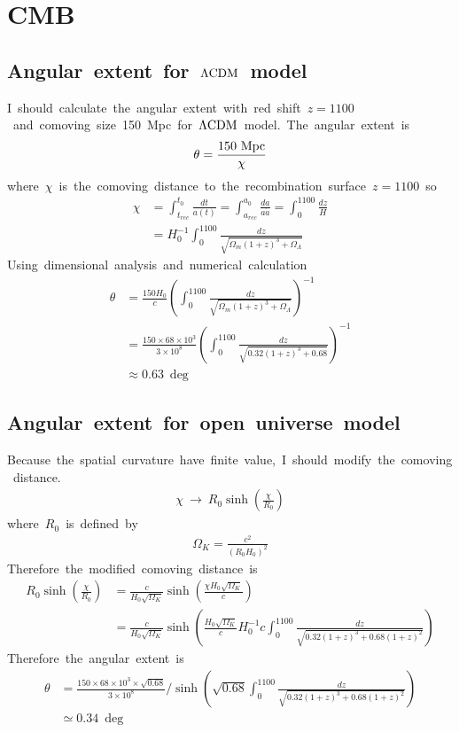 \section{CMB}
\subsection{Angular\ extent\ for\ $\Lambda\rm{CDM}$\ model}
I\ should\ calculate\ the\ angular\ extent\ with\ red\ shift\ $z=1100$\ and\ comoving\ size\ 150\ Mpc\ for\ $\Lambda\rm{CDM}$\ model.\ The\ angular\ extent\ is
\begin{align*}
    \theta=\frac{150\ \rm{Mpc}}{\chi}
\end{align*}
where\ $\chi$\ is\ the\ comoving\ distance\ to\ the\ recombination\ surface\ $z=1100$\ so
\begin{align*}
    \chi&=\int^{t_0}_{t_{rec}}\frac{dt}{a(t)}=\int^{a_0}_{a_{rec}}\frac{da}{a\Dot{a}}=\int^{1100}_0\frac{dz}{H}\\
    &=H_0^{-1}\int^{1100}_0\frac{dz}{\sqrt{\Omega_m(1+z)^3+\Omega_{\Lambda}}}
\end{align*}
Using\ dimensional\ analysis\ and\ numerical\ calculation
\begin{align}
    \theta&=\frac{150H_0}{c}\left(\int^{1100}_0\frac{dz}{\sqrt{\Omega_m(1+z)^3+\Omega_{\Lambda}}}\right)^{-1}\nonumber\\
    &=\frac{150\times68\times10^3}{3\times10^8}\left(\int^{1100}_0\frac{dz}{\sqrt{0.32(1+z)^3+0.68}}\right)^{-1}\nonumber\\
    &\approx0.63\ \deg
\end{align}
\subsection{Angular\ extent\ for\ open\ universe\ model}
Because\ the\ spatial\ curvature\ have\ finite\ value,\ I\ should\ modify\ the\ comoving\ distance.
\begin{align*}
    \chi\ \to\ R_0\sinh{\left(\frac{\chi}{R_0}\right)}
\end{align*}
where\ $R_0$\ is\ defined\ by
\begin{align*}
    \Omega_K=\frac{c^2}{(R_0H_0)^2}
\end{align*}
Therefore\ the\ modified\ comoving\ distance\ is
\begin{align*}
    R_0\sinh{\left(\frac{\chi}{R_0}\right)}&=\frac{c}{H_0\sqrt{\Omega_K}}\sinh{\left(\frac{\chi H_0\sqrt{\Omega_K}}{c}\right)}\\
    &=\frac{c}{H_0\sqrt{\Omega_K}}\sinh{\left(\frac{H_0\sqrt{\Omega_K}}{c}H_0^{-1}c\int^{1100}_0\frac{dz}{\sqrt{0.32(1+z)^3+0.68(1+z)^2}}\right)}
\end{align*}
Therefore\ the\ angular\ extent\ is
\begin{align}
    \theta&=\frac{150\times68\times10^3\times\sqrt{0.68}}{3\times10^8}/\sinh{\left(\sqrt{0.68}\int^{1100}_0\frac{dz}{\sqrt{0.32(1+z)^3+0.68(1+z)^2}}\right)}\nonumber\\
    &\simeq0.34\ \deg
\end{align}
